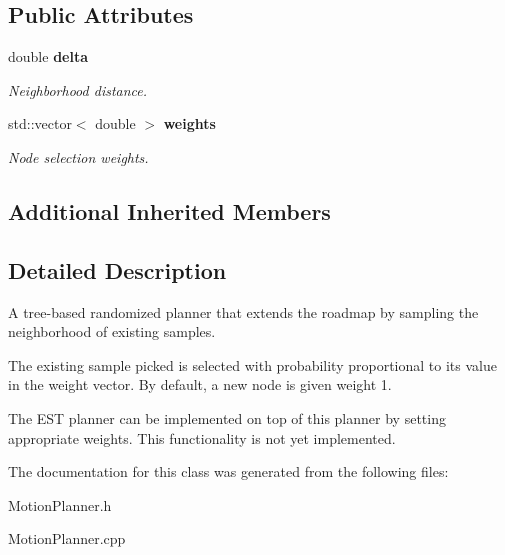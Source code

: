 \subsection*{Public Attributes}
\begin{DoxyCompactItemize}
\item 
double {\bf delta}\label{classPerturbationTreePlanner_a515688424c6bf53a9f5a77952091c326}

\begin{DoxyCompactList}\small\item\em Neighborhood distance. \end{DoxyCompactList}\item 
std\+::vector$<$ double $>$ {\bf weights}\label{classPerturbationTreePlanner_abfe29d343ea150e30a3d28218b542391}

\begin{DoxyCompactList}\small\item\em Node selection weights. \end{DoxyCompactList}\end{DoxyCompactItemize}
\subsection*{Additional Inherited Members}


\subsection{Detailed Description}
A tree-\/based randomized planner that extends the roadmap by sampling the neighborhood of existing samples. 

The existing sample picked is selected with probability proportional to its value in the weight vector. By default, a new node is given weight 1.

The E\+ST planner can be implemented on top of this planner by setting appropriate weights. This functionality is not yet implemented. 

The documentation for this class was generated from the following files\+:\begin{DoxyCompactItemize}
\item 
Motion\+Planner.\+h\item 
Motion\+Planner.\+cpp\end{DoxyCompactItemize}
